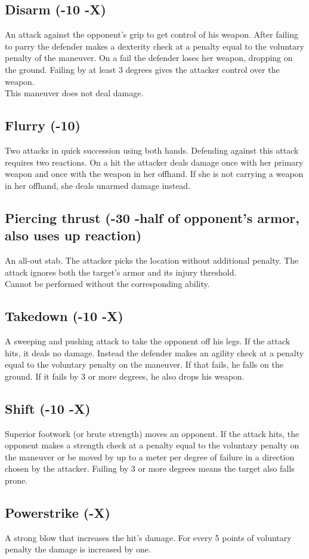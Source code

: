 \subsection*{Disarm (-10 -X)}
An attack against the opponent’s grip to get control of his weapon. After failing to parry the defender makes a dexterity check at a penalty equal to the voluntary penalty of the maneuver. On a fail the defender loses her weapon, dropping on the ground. Failing by at least 3 degrees gives the attacker control over the weapon.\\
This maneuver does not deal damage.
\subsection*{Flurry (-10)}
Two attacks in quick succession using both hands. Defending against this attack requires two reactions. On a hit the attacker deals damage once with her primary weapon and once with the weapon in her offhand. If she is not carrying a weapon in her offhand, she deals unarmed damage instead.
\subsection*{Piercing thrust (-30 -half of opponent’s armor, also uses up reaction)}
An all-out stab. The attacker picks the location without additional penalty. The attack ignores both the target's armor and its injury threshold.\\
Cannot be performed without the corresponding ability.
\subsection*{Takedown (-10 -X)}
A sweeping and pushing attack to take the opponent off his legs. If the attack hits, it deals no damage. Instead the defender makes an agility check at a penalty equal to the voluntary penalty on the maneuver. If that fails, he falls on the ground. If it fails by 3 or more degrees, he also drops his weapon.
\subsection*{Shift (-10 -X)}
Superior footwork (or brute strength) moves an opponent.
If the attack hits,
	the opponent makes a strength check at a penalty equal to the voluntary penalty on the maneuver
	or be moved by up to a meter per degree of failure in a direction chosen by the attacker.
Failing by 3 or more degrees means the target also falls prone.
\subsection*{Powerstrike (-X)}
\label{mvr:powerstrike}
A strong blow that increases the hit’s damage. For every 5 points of voluntary penalty the damage is increased by one.
